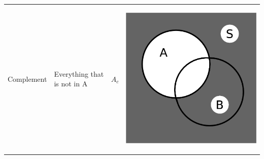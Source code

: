 \begin{center}
\begin{xtabular*}{\mytablewidth}[t]{|p{10\mystarwidth}|p{10\mystarwidth}|p{10\mystarwidth}|p{10\mystarwidth}|}
    
        Complement &
    
    
        Everything that is not in A &
    
    
        \begin{math}{A}_{c}\end{math} &
    
    
         
    \setcounter{subfigure}{0}

\label{m39373*uid14567}
    \begin{center}
    \label{m39373*uid14567!!!underscore!!!media}\label{m39373*uid14567!!!underscore!!!printimage}\includegraphics{col11306.imgs/m39373_complement.png} %
        

\end{center}
\end{xtabular*}
\end{center}
